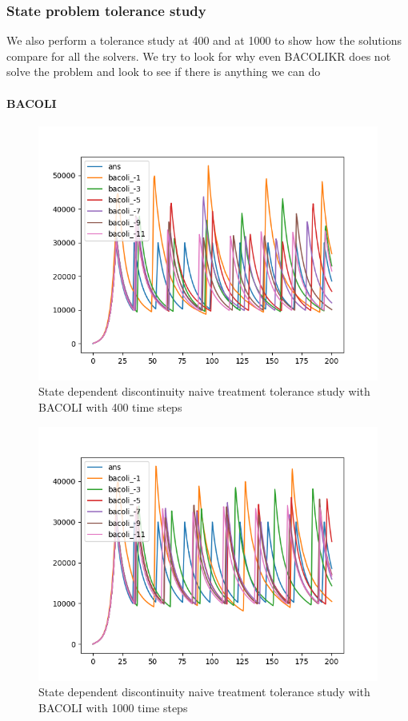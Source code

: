 \documentclass{article}
\begin{document}
\subsubsection{State problem tolerance study}
We also perform a tolerance study at 400 and at 1000 to show how the solutions compare for all the solvers. We try to look for why even BACOLIKR does not solve the problem and look to see if there is anything we can do

\paragraph{BACOLI}
\begin{figure}[H]
\centering
\includegraphics[width=0.7\linewidth]{./figures/pde_state_disc_tol_bacoli_400}
\caption{State dependent discontinuity naive treatment tolerance study with BACOLI with 400 time steps}
\label{fig:pde_state_disc_tol_bacoli_400}
\end{figure}

\begin{figure}[H]
\centering
\includegraphics[width=0.7\linewidth]{./figures/pde_state_disc_tol_bacoli_1000}
\caption{State dependent discontinuity naive treatment tolerance study with BACOLI with 1000 time steps}
\label{fig:pde_state_disc_tol_bacoli_1000}
\end{figure}
\end{document}
